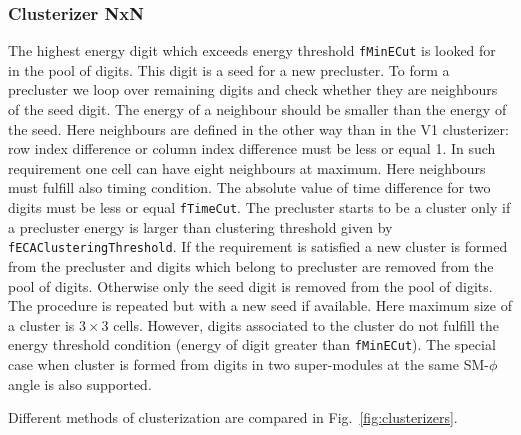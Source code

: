 \subsubsection{Clusterizer NxN}
The highest energy digit which exceeds energy threshold \texttt{fMinECut} is looked for in the pool of digits. This digit is a seed for a new precluster. To form a precluster we loop over remaining digits and check whether they are neighbours of the seed digit. The energy of a neighbour should be smaller than the energy of the seed. Here neighbours are defined in the other way than in the V1 clusterizer: row index difference or column index difference must be less or equal 1. In such requirement one cell can have eight neighbours at maximum. Here neighbours must fulfill also timing condition. The absolute value of time difference for two digits must be less or equal \texttt{fTimeCut}. The precluster starts to be a cluster only if a precluster energy is larger than clustering threshold given by \texttt{fECAClusteringThreshold}. If the requirement is satisfied a new cluster is formed from the precluster and digits which belong to precluster are removed from the pool of digits. Otherwise only the seed digit is removed from the pool of digits. The procedure is repeated but with a new seed if available. Here maximum size of a cluster is $3 \times 3$ cells. However, digits associated to the cluster do not fulfill the energy threshold condition (energy of digit greater than \texttt{fMinECut}). The special case when cluster is formed from digits in two super-modules at the same SM-$\phi$ angle is also supported.

Different methods of clusterization are compared in Fig.~\ref{fig:clusterizers}.

